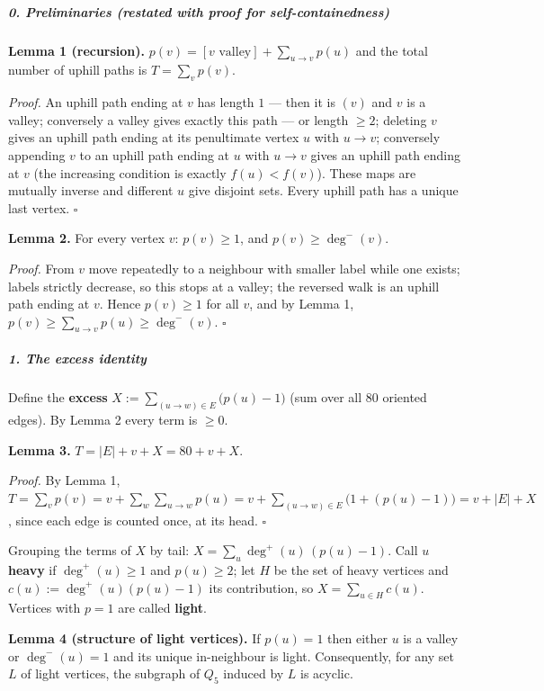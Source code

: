 \documentclass[11pt,a4paper]{article}
\begin{document}
\subparagraph{0. Preliminaries (restated with proof for
self-containedness)}\label{preliminaries-restated-with-proof-for-self-containedness}

\textbf{Lemma 1 (recursion).}
\(p(v)=[v\text{ valley}]+\sum_{u\to v}p(u)\) and the total number of
uphill paths is \(T=\sum_v p(v)\).

\emph{Proof.} An uphill path ending at \(v\) has length \(1\) --- then
it is \((v)\) and \(v\) is a valley; conversely a valley gives exactly
this path --- or length \(\ge2\); deleting \(v\) gives an uphill path
ending at its penultimate vertex \(u\) with \(u\to v\); conversely
appending \(v\) to an uphill path ending at \(u\) with \(u\to v\) gives
an uphill path ending at \(v\) (the increasing condition is exactly
\(f(u)<f(v)\)). These maps are mutually inverse and different \(u\) give
disjoint sets. Every uphill path has a unique last vertex. \(\square\)

\textbf{Lemma 2.} For every vertex \(v\): \(p(v)\ge1\), and
\(p(v)\ge\deg^-(v)\).

\emph{Proof.} From \(v\) move repeatedly to a neighbour with smaller
label while one exists; labels strictly decrease, so this stops at a
valley; the reversed walk is an uphill path ending at \(v\). Hence
\(p(v)\ge1\) for all \(v\), and by Lemma 1,
\(p(v)\ge\sum_{u\to v}p(u)\ge\deg^-(v)\). \(\square\)

\subparagraph{1. The excess identity}\label{the-excess-identity}

Define the \textbf{excess} \(X:=\sum_{(u\to w)\in E}\bigl(p(u)-1\bigr)\)
(sum over all \(80\) oriented edges). By Lemma 2 every term is \(\ge0\).

\textbf{Lemma 3.} \(T=|E|+v+X = 80+v+X\).

\emph{Proof.} By Lemma 1,
\(T=\sum_v p(v)=v+\sum_{w}\sum_{u\to w}p(u)=v+\sum_{(u\to w)\in E}\bigl(1+(p(u)-1)\bigr)=v+|E|+X\),
since each edge is counted once, at its head. \(\square\)

Grouping the terms of \(X\) by tail: \(X=\sum_u \deg^+(u)\,(p(u)-1)\).
Call \(u\) \textbf{heavy} if \(\deg^+(u)\ge1\) and \(p(u)\ge2\); let
\(H\) be the set of heavy vertices and \(c(u):=\deg^+(u)(p(u)-1)\) its
contribution, so \(X=\sum_{u\in H}c(u)\). Vertices with \(p=1\) are
called \textbf{light}.

\textbf{Lemma 4 (structure of light vertices).} If \(p(u)=1\) then
either \(u\) is a valley or \(\deg^-(u)=1\) and its unique in-neighbour
is light. Consequently, for any set \(L\) of light vertices, the
subgraph of \(Q_5\) induced by \(L\) is acyclic.
\end{document}
